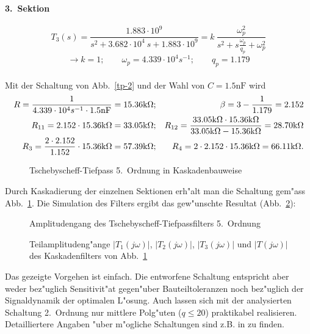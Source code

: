\paragraph{3.~Sektion}
\[ T_3(s)=\frac{1.883 \cdot 10^9}{s^2 + 3.682 \cdot 10^4 ~s
                                        + 1.883 \cdot 10^9}
        =k~ \frac{\omega_p^2}{s^2 + s \frac{\omega_p}{q_p} + \omega_p^2} \]
\[ \longrightarrow k=1;\qquad   \omega_p=4.339 \cdot 10^4 s^{-1};\qquad   q_p=1.179 \]\\
\nit Mit der Schaltung von Abb.~\ref{tp-2} und der Wahl von $C=1.5\mbox{nF}$
wird
\begin{eqnarray*}
R=\frac{1}{4.339 \cdot 10^4 s^{-1} \cdot 1.5 {\rm nF}} 
 =15.36 {\rm k}\Omega;&&\beta=3-\frac{1}{1.179}=2.152 \\
R_{11}=2.152 \cdot 15.36 {\rm k}\Omega=33.05 {\rm k}\Omega;&&R_{12}=\frac{33.05 {\rm k}\Omega \cdot 15.36 {\rm k}\Omega}
                {33.05 {\rm k}\Omega-15.36 {\rm k}\Omega}
 =28.70 {\rm k}\Omega \\
R_3=\frac{2 \cdot 2.152}{1.152} \cdot 15.36 {\rm k}\Omega
 =57.39 {\rm k}\Omega;&& R_4=2 \cdot 2.152 \cdot 15.36 {\rm k}\Omega=66.11 {\rm k}\Omega.
\end{eqnarray*}
\begin{figure}[!htb]
\begin{center}
  \caption{Tschebyscheff-Tiefpass 5.~Ordnung in Kaskadenbauweise
         \label{CC-TP-5O}}
\end{center}
\vspace*{-6mm}
\end{figure}
\nit Durch Kaskadierung der einzelnen Sektionen erh"alt man die Schaltung
gem"ass Abb.~\ref{CC-TP-5O}.  Die Simulation des
Filters ergibt das gew"unschte Resultat (Abb.~\ref{FIL_TP-Tscheb}):
\begin{figure}[!htb] %
\begin{center}
  \caption{Amplitudengang des Tschebyscheff-Tiefpassfilters  5.~Ordnung} \label{FIL_TP-Tscheb}
\end{center}
\vspace*{-6mm}
\end{figure}

\begin{figure}[!htb]%
\begin{center}
  \caption{Teilamplitudeng"ange $|T_1(j\omega)|$, $|T_2(j\omega)|$, $|T_3(j\omega)|$ und $|T(j\omega)|$ des Kaskadenfilters von Abb.~\ref{CC-TP-5O}}
\end{center}
\vspace*{-6mm}
\end{figure}
\nit Das gezeigte Vorgehen ist einfach. Die entworfene Schaltung
entspricht aber weder bez"uglich Sensitivit"at gegen"uber
Bauteiltoleranzen noch bez"uglich der
Signal\-dynamik der optimalen L"osung.  Auch
lassen sich mit der analysierten Schaltung 2.~Ordnung nur mittlere
Polg"uten ($q\leq 20$) praktikabel realisieren.  Detailliertere
Angaben "uber m"ogliche Schaltungen sind z.B. in \cite{MOS:HOR:80, VAL:82} zu finden.
\clearpage
